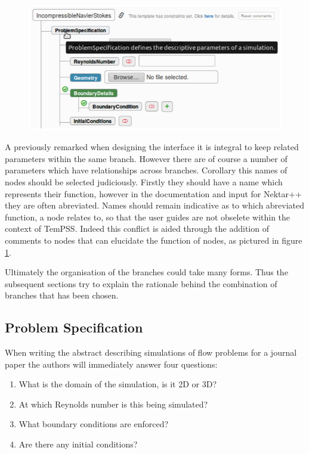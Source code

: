 \documentclass[11pt, a4paper]{report}
\begin{document}
\begin{figure}[htb!]
 \centering
 \includegraphics[width=.75\linewidth,  clip=true, trim = 0cm 0cm 0cm 0cm]{documentation}
 \label{fig:documentation}
\end{figure}

A previously remarked when designing the interface it is integral to keep related parameters within the same branch. However there are of course a number of parameters which have relationships across branches. Corollary this names of nodes should be selected judiciously. Firstly they should have a name which represents their function, however in the documentation and input for Nektar++ they are often abreviated. Names should remain indicative as to which abreviated function, a node relates to, so that the user guides are not obselete within the context of TemPSS. Indeed this conflict is aided through the addition of comments to nodes that can elucidate the function of nodes, as pictured in figure \ref{fig:documentation}.

Ultimately the organisation of the branches could take many forms. Thus the subsequent sections try to explain the rationale behind the combination of branches that has been chosen.

\subsection{Problem Specification}
When writing the abstract describing simulations of flow problems for a journal paper the authors will immediately answer four questions:
\begin{enumerate}
\item What is the domain of the simulation, is it 2D or 3D?
\item At which Reynolds number is this being simulated?
\item What boundary conditions are enforced?
\item Are there any initial conditions?
\end{enumerate}
\end{document}
